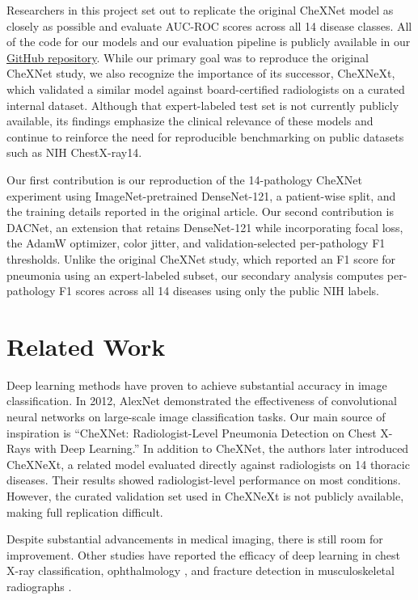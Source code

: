 Researchers in this project set out to replicate the original CheXNet model as closely
as possible and evaluate AUC-ROC scores across all 14 disease classes. All of the code
for our models and our evaluation pipeline is publicly available in our
\href{https://github.com/dstrick17/DacNet}{GitHub repository}. While our
primary goal was to reproduce the original CheXNet study, we also recognize the
importance of its successor, CheXNeXt, which validated a similar model against
board-certified radiologists on a curated internal dataset\cite{rajpurkar2018}.
Although that expert-labeled test set is not currently publicly available, its findings
emphasize the clinical relevance of these models and continue to reinforce the need for
reproducible benchmarking on public datasets such as NIH ChestX-ray14.

Our first contribution is our reproduction of the 14-pathology CheXNet
experiment using ImageNet-pretrained DenseNet-121, a patient-wise split, and
the training details reported in the original article. Our second contribution
is DACNet, an extension that retains DenseNet-121 while incorporating focal
loss, the AdamW optimizer, color jitter, and validation-selected per-pathology
F1 thresholds. Unlike the original CheXNet study, which reported an F1 score
for pneumonia using an expert-labeled subset, our secondary analysis computes
per-pathology F1 scores across all 14 diseases using only the public NIH labels.

\section{Related Work}

Deep learning methods have proven to achieve substantial accuracy in image
classification. In 2012, AlexNet demonstrated the effectiveness of
convolutional neural networks on large-scale image classification
tasks\cite{krizhevsky2012}. Our main source of inspiration is ``CheXNet:
Radiologist-Level Pneumonia Detection on Chest X-Rays with Deep Learning.'' In
addition to CheXNet, the authors later introduced CheXNeXt, a related model
evaluated directly against radiologists on 14 thoracic diseases. Their results
showed radiologist-level performance on most conditions. However, the curated
validation set used in CheXNeXt is not publicly available, making full
replication difficult.

Despite substantial advancements in medical imaging, there is still room for
improvement\cite{shen2017}. Other studies have reported the efficacy of deep
learning in chest X-ray classification\cite{kufel2023}, ophthalmology
\cite{kermany2018}, and fracture detection in musculoskeletal radiographs
\cite{jones2020}.

